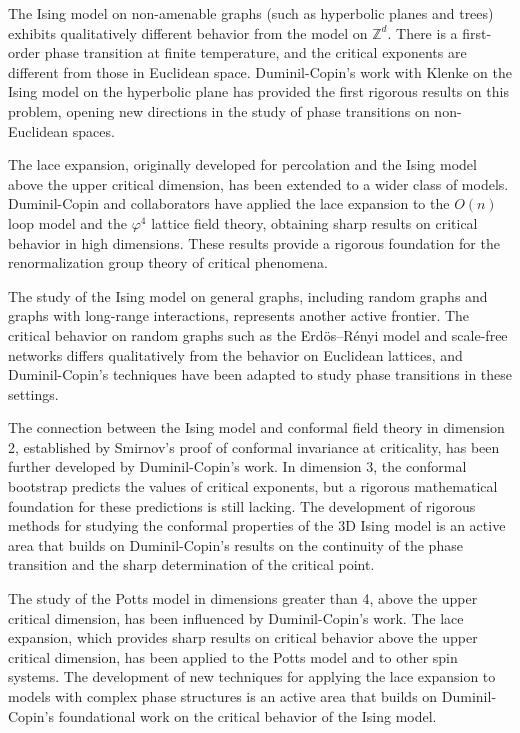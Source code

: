 The Ising model on non-amenable graphs (such as hyperbolic planes and trees) exhibits qualitatively different behavior from the model on $\mathbb{Z}^d$. There is a first-order phase transition at finite temperature, and the critical exponents are different from those in Euclidean space. Duminil-Copin's work with Klenke on the Ising model on the hyperbolic plane has provided the first rigorous results on this problem, opening new directions in the study of phase transitions on non-Euclidean spaces.

The lace expansion, originally developed for percolation and the Ising model above the upper critical dimension, has been extended to a wider class of models. Duminil-Copin and collaborators have applied the lace expansion to the $O(n)$ loop model and the $\varphi^4$ lattice field theory, obtaining sharp results on critical behavior in high dimensions. These results provide a rigorous foundation for the renormalization group theory of critical phenomena.

The study of the Ising model on general graphs, including random graphs and graphs with long-range interactions, represents another active frontier. The critical behavior on random graphs such as the Erd\"{o}s--R\'{e}nyi model and scale-free networks differs qualitatively from the behavior on Euclidean lattices, and Duminil-Copin's techniques have been adapted to study phase transitions in these settings.

The connection between the Ising model and conformal field theory in dimension 2, established by Smirnov's proof of conformal invariance at criticality, has been further developed by Duminil-Copin's work. In dimension 3, the conformal bootstrap predicts the values of critical exponents, but a rigorous mathematical foundation for these predictions is still lacking. The development of rigorous methods for studying the conformal properties of the 3D Ising model is an active area that builds on Duminil-Copin's results on the continuity of the phase transition and the sharp determination of the critical point.

The study of the Potts model in dimensions greater than 4, above the upper critical dimension, has been influenced by Duminil-Copin's work. The lace expansion, which provides sharp results on critical behavior above the upper critical dimension, has been applied to the Potts model and to other spin systems. The development of new techniques for applying the lace expansion to models with complex phase structures is an active area that builds on Duminil-Copin's foundational work on the critical behavior of the Ising model.

